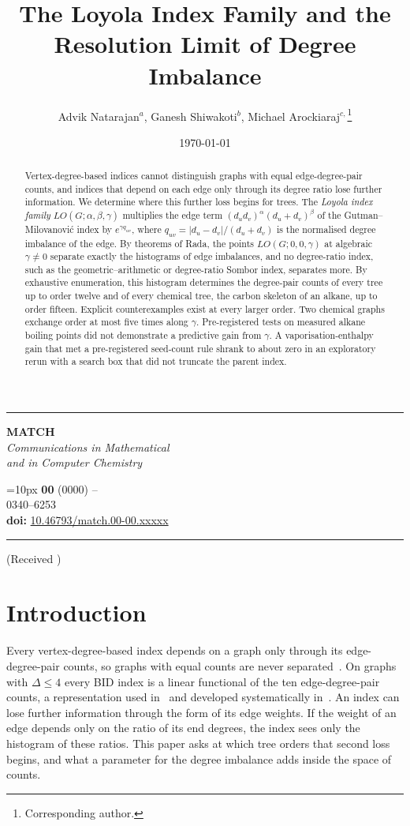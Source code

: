 \documentclass[a5paper, 10pt]{article}
\title{The Loyola Index Family and the Resolution Limit of Degree Imbalance}
\author{Advik Natarajan$^{a}$, Ganesh Shiwakoti$^{b}$, Michael Arockiaraj$^{c,}$\footnote{Corresponding author.}}
\date{\today}
\makeatletter
\theoremstyle{plain}
\theoremstyle{remark}
\theoremstyle{definition}
\renewcommand{\maketitle}{
	\begin{center}
    \rule[.2em]{\textwidth}{0.353mm}
		\begin{minipage}[m]{0.35\textwidth}
			{\scriptsize
				\begin{center}
					\textsf{\textbf{\huge MATCH}\\
						\textit{Communications in Mathematical\\
							and in Computer Chemistry}
					}
			\end{center}}
		\end{minipage}\hfill
		\begin{minipage}[m]{0.65\textwidth}
			\begin{flushright}
				\baselineskip=10px
				{\scriptsize\sffamily{\itshape  MATCH Commun. Math. Comput. Chem.}
				\textbf{\vol{}}
				(\pubyear)
					\thepage--\pageref{LastPage}}\\
				{\scriptsize\sffamily {\bfseries ISSN:} 0340--6253}\\
				{\scriptsize\sffamily \textbf{doi:} \doi{10.46793/match.\vol-\num.\id}}
			\end{flushright}
		\end{minipage}
		\rule[1em]{\textwidth}{.353mm}
		\baselineskip=0.30in
		{\Large\bfseries \@title} \par
		\vspace{5mm}
		\baselineskip=0.2in
		{\large\bfseries \@author}\par
		\vspace{1mm}
		{\it \@address} \par
		{\small\tt \@email} \par
		\vspace{3mm}
		{\small (Received \@date)} \par
	\end{center}
	\vspace{3mm}
}
\newcommand{\doi}[1]{\href{https://doi.org/#1}{#1}}
\newcommand{\vol}{00}
\newcommand{\num}{00}
\newcommand{\pubyear}{0000}
\newcommand{\id}{xxxxx}
\makeatother
\begin{document}
\maketitle

\begin{abstract}%
  Vertex-degree-based indices cannot distinguish graphs with equal
  edge-degree-pair counts, and indices that depend on each edge only
  through its degree ratio lose further information. We determine where
  this further loss begins for trees. The \emph{Loyola index family}
  $LO(G;\alpha,\beta,\gamma)$ multiplies the edge term
  $(d_u d_v)^{\alpha} (d_u + d_v)^{\beta}$ of the Gutman--Milovanovi\'c
  index by $e^{\gamma q_{uv}}$, where $q_{uv} = |d_u - d_v|/(d_u + d_v)$
  is the normalised degree imbalance of the edge. By theorems of Rada, the
  points $LO(G;0,0,\gamma)$ at algebraic $\gamma \neq 0$ separate exactly the
  histograms of edge imbalances, and no degree-ratio index, such as the
  geometric--arithmetic or degree-ratio Sombor index, separates more. By
  exhaustive enumeration, this histogram determines the degree-pair counts
  of every tree up to order twelve and of every chemical tree, the carbon
  skeleton of an alkane, up to order fifteen. Explicit counterexamples
  exist at every larger order. Two chemical graphs exchange order at most
  five times along $\gamma$. Pre-registered tests on measured alkane
  boiling points did not demonstrate a predictive gain from $\gamma$. A
  vaporisation-enthalpy gain that met a pre-registered seed-count rule
  shrank to about zero in an exploratory rerun with a search box that did
  not truncate the parent index.
\end{abstract}

\onehalfspacing

\section{Introduction}\label{sec:intro}

  Every vertex-degree-based index depends on a graph only through its
  edge-degree-pair counts, so graphs with equal counts are never
  separated~\cite{Rada2026LinearVDB}. On graphs with $\Delta \le 4$ every BID index is a linear functional
  of the ten edge-degree-pair counts, a representation used
  in~\cite{Rada2019ExpVDB, RadaRodriguezSigarreta2022Weak} and developed
  systematically in~\cite{Rada2026LinearVDB}. An index can lose further
  information through the form of its edge weights. If the weight of an
  edge depends only on the ratio of its end degrees, the index sees only
  the histogram of these ratios. This paper asks at which tree orders that
  second loss begins, and what a parameter for the degree imbalance adds
  inside the space of counts.
\end{document}
